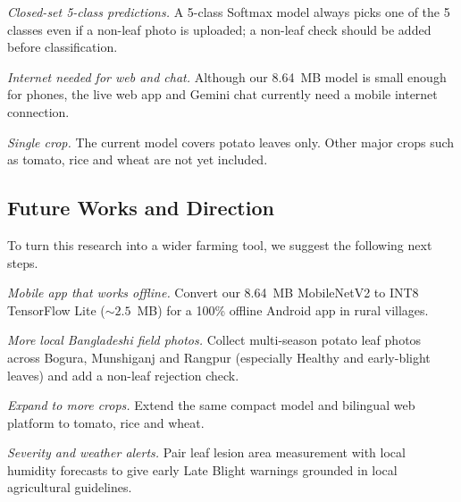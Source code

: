 \textit{Closed-set 5-class predictions.} A 5-class Softmax model always picks one of the 5 classes even if a non-leaf photo is uploaded; a non-leaf check should be added before classification.

\textit{Internet needed for web and chat.} Although our 8.64~MB model is small enough for phones, the live web app and Gemini chat currently need a mobile internet connection.

\textit{Single crop.} The current model covers potato leaves only. Other major crops such as tomato, rice and wheat are not yet included.

\subsection{Future Works and Direction}
To turn this research into a wider farming tool, we suggest the following next steps.

\textit{Mobile app that works offline.} Convert our 8.64~MB MobileNetV2 to INT8 TensorFlow Lite ($\sim 2.5$~MB) for a 100\% offline Android app in rural villages.

\textit{More local Bangladeshi field photos.} Collect multi-season potato leaf photos across Bogura, Munshiganj and Rangpur (especially Healthy and early-blight leaves) and add a non-leaf rejection check.

\textit{Expand to more crops.} Extend the same compact model and bilingual web platform to tomato, rice and wheat.

\textit{Severity and weather alerts.} Pair leaf lesion area measurement with local humidity forecasts to give early Late Blight warnings grounded in local agricultural guidelines.

